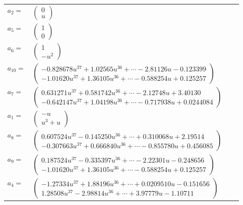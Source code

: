 \documentclass[1p]{elsarticle_modified}
\theoremstyle{definition}
\begin{document}
\begin{tabular}{m{7pt} m{180pt} m{7pt} m{180pt} }
\flushright $a_{2}=$&$\begin{pmatrix}0\\u\end{pmatrix}$ \\
\flushright $a_{5}=$&$\begin{pmatrix}1\\0\end{pmatrix}$ \\
\flushright $a_{6}=$&$\begin{pmatrix}1\\- u^2\end{pmatrix}$ \\
\flushright $a_{10}=$&$\begin{pmatrix}-0.828678 u^{37}+1.02565 u^{36}+\cdots-2.81126 u-0.123399\\-1.01620 u^{37}+1.36105 u^{36}+\cdots-0.588254 u+0.125257\end{pmatrix}$ \\
\flushright $a_{7}=$&$\begin{pmatrix}0.631271 u^{37}+0.581742 u^{36}+\cdots-2.12748 u+3.40130\\-0.642147 u^{37}+1.04198 u^{36}+\cdots-0.717938 u+0.0244084\end{pmatrix}$ \\
\flushright $a_{1}=$&$\begin{pmatrix}- u\\u^3+u\end{pmatrix}$ \\
\flushright $a_{8}=$&$\begin{pmatrix}0.607524 u^{37}-0.145250 u^{36}+\cdots+0.310068 u+2.19514\\-0.307663 u^{37}+0.666840 u^{36}+\cdots-0.855780 u+0.456085\end{pmatrix}$ \\
\flushright $a_{9}=$&$\begin{pmatrix}0.187524 u^{37}-0.335397 u^{36}+\cdots-2.22301 u-0.248656\\-1.01620 u^{37}+1.36105 u^{36}+\cdots-0.588254 u+0.125257\end{pmatrix}$ \\
\flushright $a_{4}=$&$\begin{pmatrix}-1.27334 u^{37}+1.88196 u^{36}+\cdots+0.0209510 u-0.151656\\1.28508 u^{37}-2.98814 u^{36}+\cdots+3.97779 u-1.10711\end{pmatrix}$ \\

\end{tabular}
\end{document}
